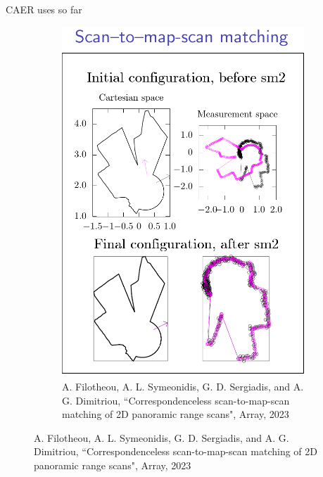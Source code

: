 \begin{frame}[noframenumbering]{CAER uses so far}
\begin{figure}
\begin{subfigure}[t]{0.5\textwidth}
      \includegraphics[scale=0.2]{./figures/07/x1.png}
      \caption{\tiny A. Filotheou, A. L. Symeonidis, G. D. Sergiadis, and A. G. Dimitriou, ``Correspondenceless scan-to-map-scan matching of 2D panoramic range scans", Array, 2023}
      \label{b}
    \end{subfigure}
  \end{figure}

\end{frame}
